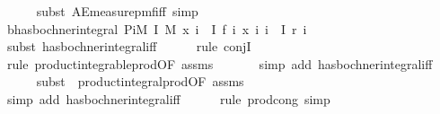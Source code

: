 \begin{isabellebody}
\ \ \ \ \isamarkupfalse%
\ {\isacharparenleft}{\kern0pt}subst\ AE{\isacharunderscore}{\kern0pt}measure{\isacharunderscore}{\kern0pt}pmf{\isacharunderscore}{\kern0pt}iff{\isacharcomma}{\kern0pt}\ simp{\isacharparenright}{\kern0pt}\isanewline
\isanewline
\ \ \isamarkupfalse%
\ b{\isacharcolon}{\kern0pt}{\isachardoublequoteopen}has{\isacharunderscore}{\kern0pt}bochner{\isacharunderscore}{\kern0pt}integral\ {\isacharparenleft}{\kern0pt}PiM\ I\ M{\isacharprime}{\kern0pt}{\isacharparenright}{\kern0pt}\ {\isacharparenleft}{\kern0pt}{\isasymlambda}x{\isachardot}{\kern0pt}\ {\isacharparenleft}{\kern0pt}{\isasymProd}i\ {\isasymin}\ I{\isachardot}{\kern0pt}\ f\ i\ {\isacharparenleft}{\kern0pt}x\ i{\isacharparenright}{\kern0pt}{\isacharparenright}{\kern0pt}{\isacharparenright}{\kern0pt}\ {\isacharparenleft}{\kern0pt}{\isasymProd}i\ {\isasymin}\ I{\isachardot}{\kern0pt}\ r\ i{\isacharparenright}{\kern0pt}{\isachardoublequoteclose}\isanewline
\ \ \ \ \isamarkupfalse%
\ {\isacharparenleft}{\kern0pt}subst\ has{\isacharunderscore}{\kern0pt}bochner{\isacharunderscore}{\kern0pt}integral{\isacharunderscore}{\kern0pt}iff{\isacharparenright}{\kern0pt}\isanewline
\ \ \ \ \isamarkupfalse%
\ {\isacharparenleft}{\kern0pt}rule\ conjI{\isacharparenright}{\kern0pt}\isanewline
\ \ \ \ \ \isamarkupfalse%
\ {\isacharparenleft}{\kern0pt}rule\ product{\isacharunderscore}{\kern0pt}integrable{\isacharunderscore}{\kern0pt}prod{\isacharbrackleft}{\kern0pt}OF\ assms{\isacharparenleft}{\kern0pt}{}{\isacharparenright}{\kern0pt}{\isacharbrackright}{\kern0pt}{\isacharparenright}{\kern0pt}\isanewline
\ \ \ \ \ \isamarkupfalse%
\ {\isacharparenleft}{\kern0pt}simp\ add{\isacharcolon}{\kern0pt}\ has{\isacharunderscore}{\kern0pt}bochner{\isacharunderscore}{\kern0pt}integral{\isacharunderscore}{\kern0pt}iff{\isacharparenright}{\kern0pt}\isanewline
\ \ \ \ \isamarkupfalse%
\ {\isacharparenleft}{\kern0pt}subst\ \ product{\isacharunderscore}{\kern0pt}integral{\isacharunderscore}{\kern0pt}prod{\isacharbrackleft}{\kern0pt}OF\ assms{\isacharparenleft}{\kern0pt}{}{\isacharparenright}{\kern0pt}{\isacharbrackright}{\kern0pt}{\isacharparenright}{\kern0pt}\isanewline
\ \ \ \ \isamarkupfalse%
\ {\isacharparenleft}{\kern0pt}simp\ add{\isacharcolon}{\kern0pt}\ has{\isacharunderscore}{\kern0pt}bochner{\isacharunderscore}{\kern0pt}integral{\isacharunderscore}{\kern0pt}iff{\isacharparenright}{\kern0pt}\isanewline
\ \ \ \ \isamarkupfalse%
\ {\isacharparenleft}{\kern0pt}rule\ prod{\isachardot}{\kern0pt}cong{\isacharcomma}{\kern0pt}\ simp{\isacharparenright}{\kern0pt}\isanewline

\end{isabellebody}
